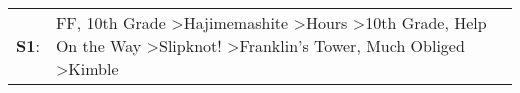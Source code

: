 \begin{supertabular}{p{0.03\textwidth}p{0.92\textwidth}}
 \textbf{S1}:  &  FF\textsuperscript{}, \enspace 10th Grade\textsuperscript{} \textgreater \enspace Hajimemashite\textsuperscript{} \textgreater \enspace Hours\textsuperscript{} \textgreater \enspace 10th Grade\textsuperscript{}, \enspace Help On the Way\textsuperscript{} \textgreater \enspace Slipknot!\textsuperscript{} \textgreater \enspace Franklin's Tower\textsuperscript{}, \enspace Much Obliged\textsuperscript{} \textgreater \enspace Kimble\textsuperscript{}  \enspace  \\
\end{supertabular}
